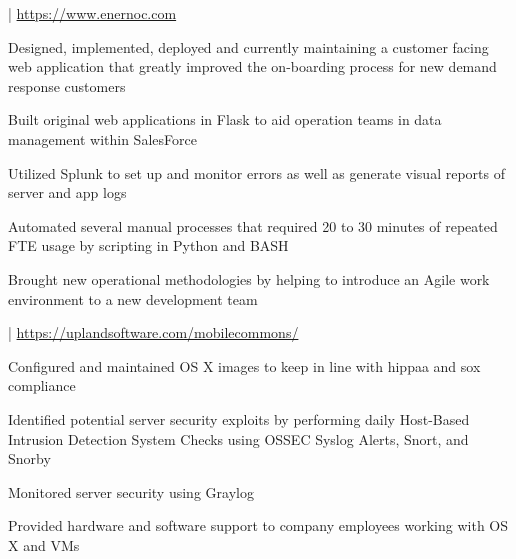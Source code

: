 \documentclass[letterpaper]{deedy-resume}
\begin{document}
\begin{minipage}[t]{0.71\textwidth}
 |
\url{https://www.enernoc.com} \\
\vspace{\topsep}
\begin{tightitemize}
\item Designed, implemented, deployed and currently maintaining a customer facing web application that greatly improved the on-boarding process for new demand response customers \\
\item Built original web applications in Flask to aid operation teams in data management within SalesForce \\
\item Utilized Splunk to set up and monitor errors as well as generate visual reports of server and app logs \\
\item Automated several manual processes that required 20 to 30 minutes of repeated FTE usage by scripting in Python and BASH \\
\item Brought new operational methodologies by helping to introduce an Agile work environment to a new development team
\end{tightitemize}
\sectionspace 

 |
\url{https://uplandsoftware.com/mobilecommons/} \\
\vspace{\topsep} 
\begin{tightitemize}
\item Configured and maintained OS X images to keep in line with hippaa and sox compliance \\
\item  Identified potential server security exploits by performing daily Host-Based Intrusion Detection System Checks using OSSEC Syslog Alerts, Snort, and Snorby \\
\item Monitored server security using Graylog \\
\item Provided hardware and software support to company employees working with OS X and VMs \\

\end{tightitemize}

\sectionspace 

\end{minipage}
\end{document}
